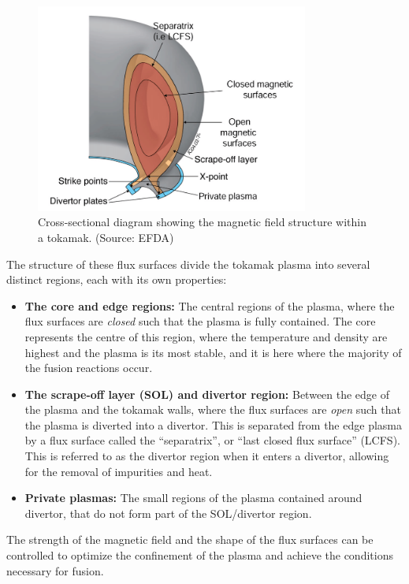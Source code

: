     \begin{figure}[!ht]
        \centering
        \includegraphics[width = 0.8\textwidth]{paper/0 - introduction/1 - plasmas/3 - tokamaks/images/tokamak structure.png}
        \caption{Cross-sectional diagram showing the magnetic field structure within a tokamak. (Source: EFDA)}
        \label{fig:tokamak structure}
    \end{figure}

    The structure of these flux surfaces divide the tokamak plasma into several distinct regions, each with its own properties:
    \begin{itemize}
        \item  {\bf The core and edge regions:} The central regions of the plasma, where the flux surfaces are \emph{closed} such that the plasma is fully contained. The core represents the centre of this region, where the temperature and density are highest and the plasma is its most stable, and it is here where the majority of the fusion reactions occur.
        \item  {\bf The scrape-off layer (SOL) and divertor region:} Between the edge of the plasma and the tokamak walls, where the flux surfaces are \emph{open} such that the plasma is diverted into a divertor. This is separated from the edge plasma by a flux surface called the ``separatrix'', or ``last closed flux surface'' (LCFS). This is referred to as the divertor region when it enters a divertor, allowing for the removal of impurities and heat.
        \item  {\bf Private plasmas:} The small regions of the plasma contained around divertor, that do not form part of the SOL/divertor region.
    \end{itemize}
    The strength of the magnetic field and the shape of the flux surfaces can be controlled to optimize the confinement of the plasma and achieve the conditions necessary for fusion.
    